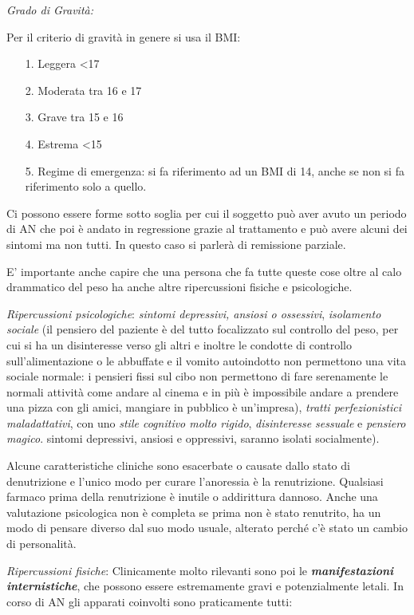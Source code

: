\emph{\emph{Grado di Gravità:}}

Per il criterio di gravità in genere si usa il BMI:

\begin{itemize}
\item[1.]
  Leggera \textless{}17
\item[2.]
  Moderata tra 16 e 17
\item[3.]
  Grave tra 15 e 16
\item[4.]
  Estrema \textless{}15
\item[5.]
  Regime di emergenza: si fa riferimento ad un BMI di 14, anche se non
  si fa riferimento solo a quello.
\end{itemize}

Ci possono essere forme sotto soglia per cui il soggetto può aver avuto
un periodo di AN che poi è andato in regressione grazie al trattamento e
può avere alcuni dei sintomi ma non tutti. In questo caso si parlerà di
remissione parziale.

E' importante anche capire che una persona che fa tutte queste cose
oltre al calo drammatico del peso ha anche altre ripercussioni fisiche e
psicologiche.

\emph{\emph{Ripercussioni psicologiche}}: \emph{sintomi depressivi,
ansiosi o ossessivi}, \emph{isolamento sociale} (il pensiero del
paziente è del tutto focalizzato sul controllo del peso, per cui si ha
un disinteresse verso gli altri e inoltre le condotte di controllo
sull'alimentazione o le abbuffate e il vomito autoindotto non permettono
una vita sociale normale: i pensieri fissi sul cibo non permettono di
fare serenamente le normali attività come andare al cinema e in più è
impossibile andare a prendere una pizza con gli amici, mangiare in
pubblico è un'impresa), \emph{tratti perfezionistici maladattativi}, con
uno \emph{stile cognitivo molto rigido}, \emph{disinteresse sessuale} e
\emph{pensiero magico}. sintomi depressivi, ansiosi e oppressivi,
saranno isolati socialmente).

Alcune caratteristiche cliniche sono esacerbate o causate dallo stato di
denutrizione e l'unico modo per curare l'anoressia è la renutrizione.
Qualsiasi farmaco prima della renutrizione è inutile o addirittura
dannoso. Anche una valutazione psicologica non è completa se prima non è
stato renutrito, ha un modo di pensare diverso dal suo modo usuale,
alterato perché c'è stato un cambio di personalità.

\emph{\emph{Ripercussioni fisiche}}: Clinicamente molto rilevanti sono
poi le \textbf{\emph{manifestazioni internistiche}}, che possono essere
estremamente gravi e potenzialmente letali. In corso di AN gli apparati
coinvolti sono praticamente tutti:

